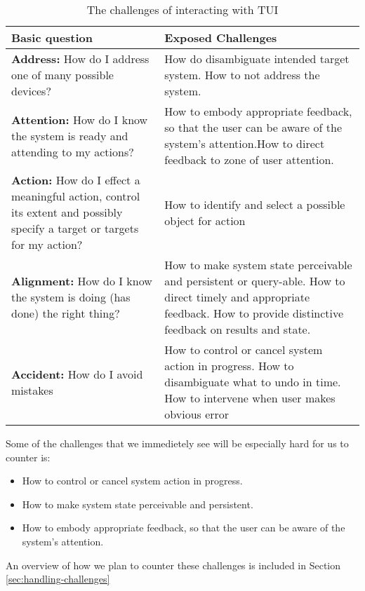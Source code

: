 \begin{table}[H]
	\begin{tabular}{| p{6.0cm} | p{7.0cm} |}
	\hline
	\textbf{Basic question} & \textbf{Exposed Challenges} \\
	\hline
	\textbf{Address:} How do I address one of many possible devices? & How do disambiguate intended target system. \newline How to not address the system. \\ 
	\hline
	\textbf{Attention:} How do I know the system is ready and attending to my actions? & How to embody appropriate feedback, so that the user can be aware of the system's attention.\newline How to direct feedback to zone of user attention. \\
	\hline
	\textbf{Action:} How do I effect a meaningful action, control its extent and possibly specify a target or targets for my action? & How to identify and select a possible object for action \\
	\hline
	\textbf{Alignment:} How do I know the system is doing (has done) the right thing? & How to make system state perceivable and persistent or query-able. \newline How to direct timely and appropriate feedback. \newline How to provide distinctive feedback on results and state. \\ 
	\hline 
	\textbf{Accident:} How do I avoid mistakes & How to control or cancel system action in progress. \newline How to disambiguate what to undo in time. \newline How to intervene when user makes obvious error \\
	\hline
	\end{tabular}
	\caption{The challenges of interacting with TUI \cite{bellotti2002making}}
	\label{tab:tuichallenges}
\end{table}

Some of the challenges that we immedietely see will be especially hard for us to counter is:
\begin{itemize}
  \item How to control or cancel system action in progress.
  \item How to make system state perceivable and persistent. 
  \item How to embody appropriate feedback, so that the user can be aware of the system's attention. 
\end{itemize} 
An overview of how we plan to counter these challenges is included in Section \ref{sec:handling-challenges}
 

